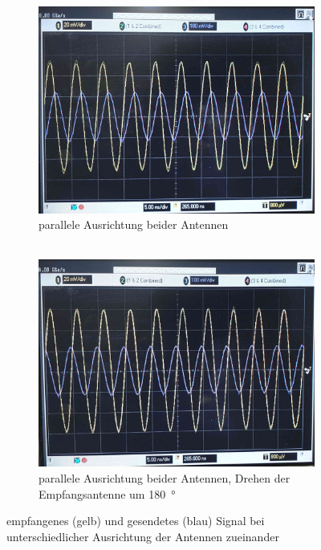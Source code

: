 \documentclass[a4paper,twoside,final]{article}
\begin{document}
\begin{figure}[htp]
    \centering
    \begin{subfigure}{0.45\textwidth}
        \includegraphics[width=\textwidth]{Bilder/Antenne_Phasenverschiebung1.jpg}
        \caption{parallele Ausrichtung beider Antennen\\$~$}
    \end{subfigure}\hspace{1cm}
    \begin{subfigure}{0.45\textwidth}
        \includegraphics[width=\textwidth]{Bilder/Antenne_Phasenverschiebung2.jpg}
        \caption{parallele Ausrichtung beider Antennen, Drehen der Empfangsantenne um \SI{180}{\degree}}
    \end{subfigure}
    \caption{empfangenes (gelb) und gesendetes (blau) Signal bei unterschiedlicher Ausrichtung der Antennen zueinander}
\end{figure}
\end{document}
